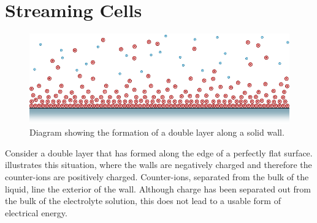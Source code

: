 

\section{Streaming Cells}
  \label{sect:background_streamingCells}


  \begin{figure}
      \centering
      \includegraphics{content/pt1/01-PowerHarvesting/graphics/intro_2_wall}
      \caption{
        \label{fig:doubleLayerBetweenWalls}
        Diagram showing the formation of a double layer along a solid wall.
      }
  \end{figure}
  Consider a double layer that has formed along the edge of a perfectly flat surface.
   illustrates this situation, where the walls are negatively charged and therefore the counter-ions are positively charged.
  Counter-ions, separated from the bulk of the liquid, line the exterior of the wall.
  Although charge has been separated out from the bulk of the electrolyte solution, this does not lead to a usable form of electrical energy.

